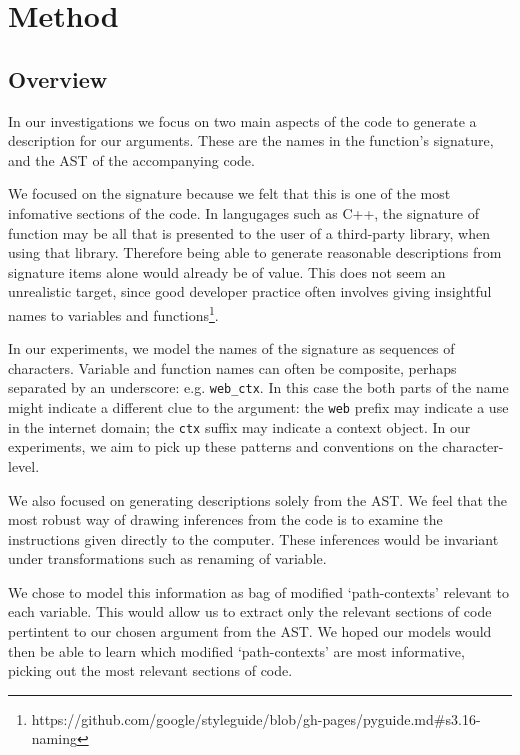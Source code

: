 \chapter{Method}
\label{the_models}

\section{Overview}

In our investigations we focus on two main aspects of the code to generate a description for our arguments. 
These are the names in the function's signature, and the AST of the accompanying code. 

We focused on the signature because we felt that this is one of the most infomative sections of the code. 
In langugages such as C++, the signature of function may be all that is presented to the user of a third-party library, when using that library. 
Therefore being able to generate reasonable descriptions from signature items alone would already be of value. 
This does not seem an unrealistic target, since good developer practice often involves giving insightful names to variables and functions\footnote{https://github.com/google/styleguide/blob/gh-pages/pyguide.md\#s3.16-naming}.

In our experiments, we model the names of the signature as sequences of characters. Variable and function names can often be composite, perhaps separated by an underscore: e.g. \texttt{web_ctx}. 
In this case the both parts of the name might indicate a different clue to the argument:  the  \texttt{web} prefix may indicate a use in the internet domain; the \texttt{ctx} suffix may indicate a context object. 
In our experiments, we aim to pick up these patterns and conventions on the character-level.

We also focused on generating descriptions solely from the AST. We feel that the most robust way of drawing inferences from the code is to examine the instructions given directly to the computer. 
These inferences would be invariant under transformations such as renaming of variable. 

We chose to model this information as bag of modified `path-contexts' \cite{alon_general_2018} relevant to each variable. This would allow us to extract only the relevant sections of code pertintent to our chosen argument from the AST. 
We hoped our models would then be able to learn which modified `path-contexts' are most informative, picking out the most relevant sections of code.

